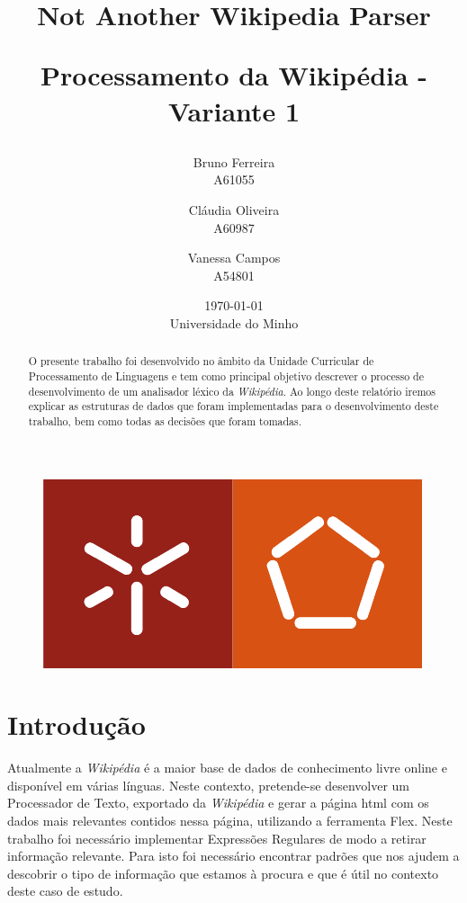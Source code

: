 \documentclass[11pt, a4paper, oneside]{article}
\begin{document}
\title{Not Another Wikipedia Parser\\
\begin{normalsize}
Processamento da Wikipédia - Variante 1
\end{normalsize}}
\date{\today\\Universidade do Minho}
\author{
  Bruno Ferreira\\
  {\small A61055}\\
  \and
  Cláudia Oliveira\\
  {\small A60987}\\
  \and
  Vanessa Campos\\
  {\small A54801}\\
}

\maketitle

\begin{figure}[h]
\begin{center}
\includegraphics[width=0.4\linewidth]{logo}
\end{center}
\end{figure}


\begin{abstract}

  O presente trabalho foi desenvolvido no âmbito da Unidade Curricular de Processamento de Linguagens e tem como principal objetivo descrever o processo de desenvolvimento de um analisador léxico da \textit{Wikipédia}. Ao longo deste relatório iremos explicar as estruturas de dados que foram implementadas para o desenvolvimento deste trabalho, bem como todas as decisões que foram tomadas.

\end{abstract}
\newpage

\tableofcontents
\listoffigures 

\newpage
\section{Introdução}

Atualmente a \textit{Wikipédia} é a maior base de dados de conhecimento livre online e disponível em várias línguas. Neste contexto, pretende-se desenvolver um Processador de Texto, exportado da \textit{Wikipédia} e gerar a página html com os dados mais relevantes contidos nessa página, utilizando a ferramenta Flex. 
Neste trabalho foi necessário implementar Expressões Regulares de modo a retirar informação relevante. Para isto foi necessário encontrar padrões que nos ajudem a descobrir o tipo de informação que estamos à procura e que é útil no contexto deste caso de estudo.
\end{document}
